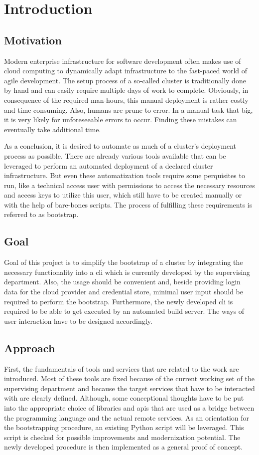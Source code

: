 \chapter{Introduction}
\section{Motivation}
Modern enterprise infrastructure for software development often makes use of cloud computing to dynamically adapt infrastructure to the fast-paced world of agile development.
The setup process of a so-called cluster is traditionally done by hand and can easily require multiple days of work to complete.
Obviously, in consequence of the required man-hours, this manual deployment is rather costly and time-consuming.
Also, humans are prune to error.
In a manual task that big, it is very likely for unforeseeable errors to occur.
Finding these mistakes can eventually take additional time.

As a conclusion, it is desired to automate as much of a cluster's deployment process as possible.
There are already various tools available that can be leveraged to perform an automated deployment of a declared cluster infrastructure.
But even these automatization tools require some perquisites to run, like a technical access user with permissions to access the necessary resources and access keys to utilize this user, which still have to be created manually or with the help of bare-bones scripts.
The process of fulfilling these requirements is referred to as bootstrap.

\section{Goal}
Goal of this project is to simplify the bootstrap of a cluster by integrating the necessary functionality into a \acf{cli} which is currently developed by the supervising department.
Also, the usage should be convenient and, beside providing login data for the cloud provider and credential store, minimal user input should be required to perform the bootstrap.
Furthermore, the newly developed \ac{cli} is required to be able to get executed by an automated build server.
The ways of user interaction have to be designed accordingly.

\section{Approach}
First, the fundamentals of tools and services that are related to the work are introduced.
Most of these tools are fixed because of the current working set of the supervising department and because the target services that have to be interacted with are clearly defined.
Although, some conceptional thoughts have to be put into the appropriate choice of libraries and \acp{api} that are used as a bridge between the programming language and the actual remote services.
As an orientation for the bootstrapping procedure, an existing Python script will be leveraged.
This script is checked for possible improvements and modernization potential.
The newly developed procedure is then implemented as a general proof of concept.

